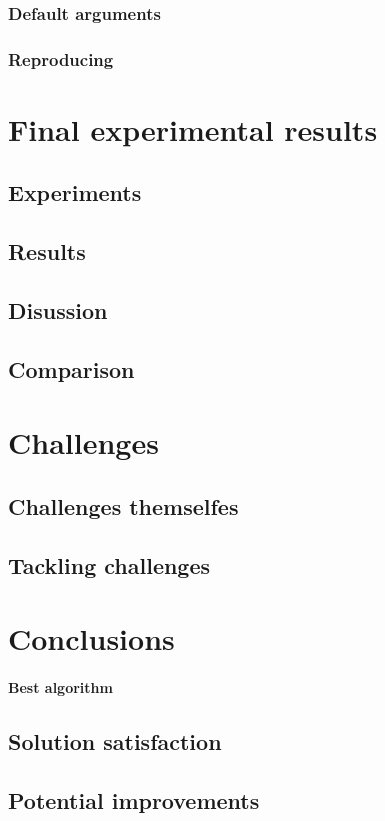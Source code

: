 \documentclass[12pt]{article}
\begin{document}
    \subsubsection{Default arguments}
    \subsubsection{Reproducing}

\section{Final experimental results}
\subsection{Experiments}
\subsection{Results}
\subsection{Disussion}
\subsection{Comparison}

\section{Challenges}
\subsection{Challenges themselfes}
\subsection{Tackling challenges}

\section{Conclusions}
\paragraph{Best algorithm}
\subsection{Solution satisfaction}
\subsection{Potential improvements}
\end{document}
